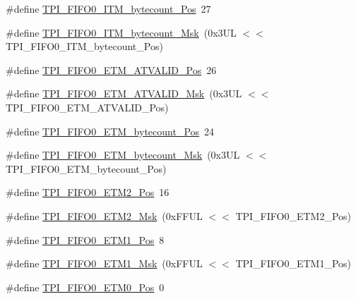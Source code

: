 \begin{DoxyCompactItemize}
\item 
\#define \hyperlink{group___c_m_s_i_s___t_p_i_gac2b6f7f13a2fa0be4aa7645a47dcac52}{T\+P\+I\+\_\+\+F\+I\+F\+O0\+\_\+\+I\+T\+M\+\_\+bytecount\+\_\+\+Pos}~27
\item 
\#define \hyperlink{group___c_m_s_i_s___t_p_i_ga07bafa971b8daf0d63b3f92b9ae7fa16}{T\+P\+I\+\_\+\+F\+I\+F\+O0\+\_\+\+I\+T\+M\+\_\+bytecount\+\_\+\+Msk}~(0x3\+U\+L $<$$<$ T\+P\+I\+\_\+\+F\+I\+F\+O0\+\_\+\+I\+T\+M\+\_\+bytecount\+\_\+\+Pos)
\item 
\#define \hyperlink{group___c_m_s_i_s___t_p_i_ga7fdeb3e465ca4aa9e3b2f424ab3bbd1d}{T\+P\+I\+\_\+\+F\+I\+F\+O0\+\_\+\+E\+T\+M\+\_\+\+A\+T\+V\+A\+L\+I\+D\+\_\+\+Pos}~26
\item 
\#define \hyperlink{group___c_m_s_i_s___t_p_i_ga4f0005dc420b28f2369179a935b9a9d3}{T\+P\+I\+\_\+\+F\+I\+F\+O0\+\_\+\+E\+T\+M\+\_\+\+A\+T\+V\+A\+L\+I\+D\+\_\+\+Msk}~(0x3\+U\+L $<$$<$ T\+P\+I\+\_\+\+F\+I\+F\+O0\+\_\+\+E\+T\+M\+\_\+\+A\+T\+V\+A\+L\+I\+D\+\_\+\+Pos)
\item 
\#define \hyperlink{group___c_m_s_i_s___t_p_i_ga2f738e45386ebf58c4d406f578e7ddaf}{T\+P\+I\+\_\+\+F\+I\+F\+O0\+\_\+\+E\+T\+M\+\_\+bytecount\+\_\+\+Pos}~24
\item 
\#define \hyperlink{group___c_m_s_i_s___t_p_i_gad2536b3a935361c68453cd068640af92}{T\+P\+I\+\_\+\+F\+I\+F\+O0\+\_\+\+E\+T\+M\+\_\+bytecount\+\_\+\+Msk}~(0x3\+U\+L $<$$<$ T\+P\+I\+\_\+\+F\+I\+F\+O0\+\_\+\+E\+T\+M\+\_\+bytecount\+\_\+\+Pos)
\item 
\#define \hyperlink{group___c_m_s_i_s___t_p_i_ga5f0037cc80c65e86d9e94e5005077a48}{T\+P\+I\+\_\+\+F\+I\+F\+O0\+\_\+\+E\+T\+M2\+\_\+\+Pos}~16
\item 
\#define \hyperlink{group___c_m_s_i_s___t_p_i_gaa82a7b9b99c990fb12eafb3c84b68254}{T\+P\+I\+\_\+\+F\+I\+F\+O0\+\_\+\+E\+T\+M2\+\_\+\+Msk}~(0x\+F\+F\+U\+L $<$$<$ T\+P\+I\+\_\+\+F\+I\+F\+O0\+\_\+\+E\+T\+M2\+\_\+\+Pos)
\item 
\#define \hyperlink{group___c_m_s_i_s___t_p_i_gac5a2ef4b7f811d1f3d81ec919d794413}{T\+P\+I\+\_\+\+F\+I\+F\+O0\+\_\+\+E\+T\+M1\+\_\+\+Pos}~8
\item 
\#define \hyperlink{group___c_m_s_i_s___t_p_i_gaad9c1a6ed34a70905005a0cc14d5f01b}{T\+P\+I\+\_\+\+F\+I\+F\+O0\+\_\+\+E\+T\+M1\+\_\+\+Msk}~(0x\+F\+F\+U\+L $<$$<$ T\+P\+I\+\_\+\+F\+I\+F\+O0\+\_\+\+E\+T\+M1\+\_\+\+Pos)
\item 
\#define \hyperlink{group___c_m_s_i_s___t_p_i_ga48783ce3c695d8c06b1352a526110a87}{T\+P\+I\+\_\+\+F\+I\+F\+O0\+\_\+\+E\+T\+M0\+\_\+\+Pos}~0
\item 
$$
\end{DoxyCompactItemize}
